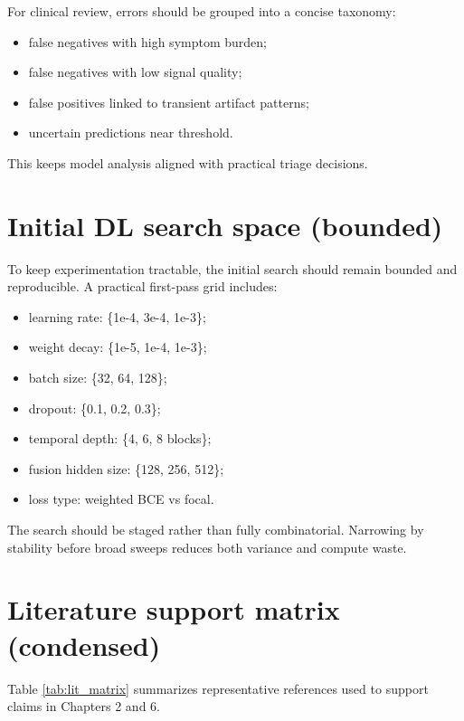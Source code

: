 For clinical review, errors should be grouped into a concise taxonomy:
\begin{itemize}[leftmargin=1.2cm]
    \item false negatives with high symptom burden;
    \item false negatives with low signal quality;
    \item false positives linked to transient artifact patterns;
    \item uncertain predictions near threshold.
\end{itemize}

This keeps model analysis aligned with practical triage decisions.

\section{Initial DL search space (bounded)}
To keep experimentation tractable, the initial search should remain bounded and reproducible. A practical first-pass grid includes:
\begin{itemize}[leftmargin=1.2cm]
    \item learning rate: \{1e-4, 3e-4, 1e-3\};
    \item weight decay: \{1e-5, 1e-4, 1e-3\};
    \item batch size: \{32, 64, 128\};
    \item dropout: \{0.1, 0.2, 0.3\};
    \item temporal depth: \{4, 6, 8 blocks\};
    \item fusion hidden size: \{128, 256, 512\};
    \item loss type: weighted BCE vs focal.
\end{itemize}

The search should be staged rather than fully combinatorial. Narrowing by stability before broad sweeps reduces both variance and compute waste.

\section{Literature support matrix (condensed)}
Table \ref{tab:lit_matrix} summarizes representative references used to support claims in Chapters 2 and 6.

